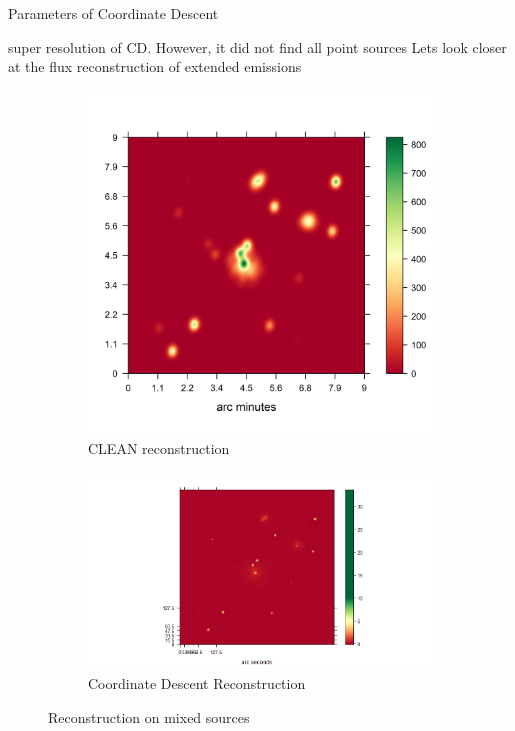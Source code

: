 Parameters of Coordinate Descent

super resolution of CD. However, it did not find all point sources
Lets look closer at the flux reconstruction of extended emissions

\begin{figure}[h]
	\centering
	\begin{subfigure}[b]{0.4\linewidth}
		\includegraphics[width=\linewidth, trim={0.2in, 0.2in, 0, 0.2in}, clip]{./chapters/20.results/mixed/mixed_clean.png}
		\caption{CLEAN reconstruction}
		\label{results:mixed:tclean}
	\end{subfigure}
	\begin{subfigure}[b]{0.4\linewidth}
		\includegraphics[width=\linewidth, trim={0.2in, 0.2in, 0, 0.2in}, clip]{./chapters/20.results/mixed/mixed_cd.png}
		\caption{Coordinate Descent Reconstruction}
		\label{results:mixed:cd}
	\end{subfigure}
	\caption{Reconstruction on mixed sources}
	\label{results:mixed}
\end{figure}

